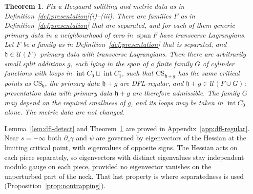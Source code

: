 \documentclass[11pt]{amsart}
\newtheorem{theorem}{Theorem}[section]
\theoremstyle{definition}
\theoremstyle{remark}
\theoremstyle{plain}
\numberwithin{equation}{section}
\begin{document}
\begin{theorem}\label{thm:dfl-regular}
Fix a Heegaard splitting and metric data as in Definition~\ref{def:presentation}(i)--(iii).
There are families $F$ as in Definition~\ref{def:presentation} that are separated, and for each of them
generic primary data in a neighbourhood of zero in $\operatorname{span}F$ have transverse
Lagrangians. Let $F$ be a family as in Definition~\ref{def:presentation} that is separated, and
$\mathfrak h\in\mathcal U(F)$ primary data with transverse Lagrangians. Then there are
arbitrarily small split additions $g$, each lying in the span of a finite family $G$ of
cylinder functions with loops in
$\operatorname{int}C_0^\circ\sqcup\operatorname{int}C_1^\circ$, such that
$\mathrm{CS}_{\mathfrak h+g}$ has the same critical
points as $\mathrm{CS}_{\mathfrak h}$, the primary data $\mathfrak h+g$ are DFL-regular, and
$\mathfrak h+g\in\mathcal U(F\cup G)$; presentation data with primary data $\mathfrak h+g$ are
therefore admissible. The family $G$ may depend on the required smallness of $g$, and its loops
may be taken in $\operatorname{int}C_0^\circ$ alone. The metric data are not changed.
\end{theorem}

Lemma~\ref{lem:dfl-detect} and Theorem~\ref{thm:dfl-regular} are proved in
Appendix~\ref{app:dfl-regular}. Near $s=-\infty$ both $\partial_s\gamma$ and $\psi$ are governed by
eigenvectors of the Hessian at the limiting critical point, with eigenvalues of opposite signs.
The Hessian acts on each piece separately, so eigenvectors with distinct eigenvalues stay
independent modulo gauge on each piece, provided no eigenvector vanishes on the unperturbed part
of the neck. That last property is where separatedness is used
(Proposition~\ref{prop:nontrapping}).
\end{document}
